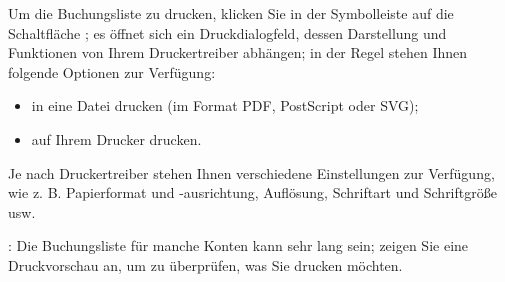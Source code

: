 Um die Buchungsliste zu drucken, klicken Sie in der Symbolleiste auf die Schaltfläche ; es öffnet sich ein Druckdialogfeld, dessen Darstellung und Funktionen von Ihrem Druckertreiber abhängen; in der Regel stehen Ihnen folgende Optionen zur Verfügung:
\begin{itemize}
	\item in eine Datei drucken (im Format \gls{PDF}, \gls{PostScript} oder \gls{SVG});
	\item auf Ihrem Drucker drucken.
\end{itemize}

Je nach Druckertreiber stehen Ihnen verschiedene Einstellungen zur Verfügung, wie z. B. Papierformat und -ausrichtung, Auflösung, Schriftart und Schriftgröße usw.

\Note{}: Die Buchungsliste für manche Konten kann sehr lang sein; zeigen Sie eine Druckvorschau an, um zu überprüfen, was Sie drucken möchten.
